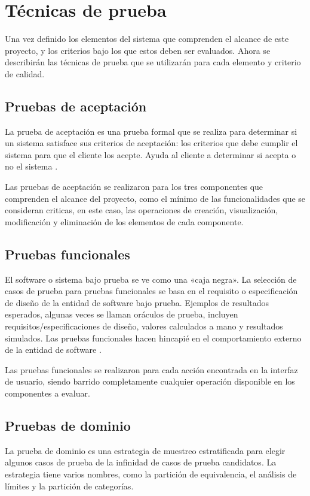 \section{Técnicas de prueba}
Una vez definido los elementos del sistema que comprenden el alcance de este
proyecto, y los criterios bajo los que estos deben ser evaluados. Ahora se
describirán las técnicas de prueba que se utilizarán para cada elemento y
criterio de calidad.

\subsection{Pruebas de aceptación}
La prueba de aceptación es una prueba formal que se realiza para determinar si
un sistema satisface sus criterios de aceptación: los criterios que debe cumplir
el sistema para que el cliente los acepte. Ayuda al cliente a determinar si
acepta o no el sistema \parencite{Naik}.

Las pruebas de aceptación se realizaron para los tres componentes que comprenden
el alcance del proyecto, como el mínimo de las funcionalidades que se consideran
criticas, en este caso, las operaciones de creación, visualización, modificación
y eliminación de los elementos de cada componente.

\subsection{Pruebas funcionales}
El software o sistema bajo prueba se ve como una «caja negra». La selección de
casos de prueba para pruebas funcionales se basa en el requisito o
especificación de diseño de la entidad de software bajo prueba. Ejemplos de
resultados esperados, algunas veces se llaman oráculos de prueba, incluyen
requisitos/especificaciones de diseño, valores calculados a mano y resultados
simulados. Las pruebas funcionales hacen hincapié en el comportamiento externo
de la entidad de software \parencite{Luo}.

Las pruebas funcionales se realizaron para cada acción encontrada en la interfaz
de usuario, siendo barrido completamente cualquier operación disponible en los
componentes a evaluar.

\subsection{Pruebas de dominio}
La prueba de dominio es una estrategia de muestreo estratificada para elegir
algunos casos de prueba de la infinidad de casos de prueba candidatos. La
estrategia tiene varios nombres, como la partición de equivalencia, el análisis
de límites y la partición de categorías.

